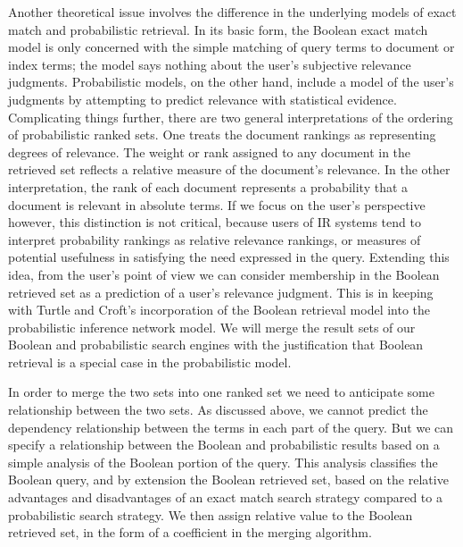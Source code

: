 Another theoretical issue involves the difference in the underlying
models of exact match and probabilistic retrieval. In its basic form,
the Boolean exact match model is only concerned with the simple
matching of query terms to document or index terms; the model says
nothing about the user's subjective relevance judgments. Probabilistic
models, on the other hand, include a model of the user's judgments by
attempting to predict relevance with statistical evidence.
Complicating things further, there are two general interpretations of
the ordering of probabilistic ranked
sets\cite{BOOKSTEIN85,FOXKOLL}. One treats the document rankings as
representing degrees of relevance. The weight or rank assigned to any
document in the retrieved set reflects a relative measure of the
document's relevance. In the other interpretation, the rank of each
document represents a probability that a document is relevant in
absolute terms. If we focus on the user's perspective however, this
distinction is not critical, because users of IR systems tend to
interpret probability rankings as relative relevance rankings, or
measures of potential usefulness in satisfying the need expressed in
the query\cite{BOOKSTEIN83}. Extending this idea, from the user's
point of view we can consider membership in the Boolean retrieved set
as a prediction of a user's relevance judgment. This is in keeping
with Turtle and Croft's incorporation of the Boolean retrieval model
into the probabilistic inference network
model\cite{TURTLE90,TURTLE92}.  We will merge the result sets of our
Boolean and probabilistic search engines with the justification that
Boolean retrieval is a special case in the probabilistic model.

In order to merge the two sets into one ranked set we need to 
anticipate some relationship between the two sets. As discussed above, we 
cannot predict the dependency relationship between the terms in each
part of the query. But we can specify a relationship between the Boolean
and probabilistic results based on a simple analysis of 
the Boolean portion of the query. This analysis classifies the Boolean
query, and by extension the Boolean retrieved set, based on the
relative advantages and disadvantages of an exact match search strategy 
compared to a probabilistic search strategy. We then assign relative value 
to the Boolean retrieved set, in the form of a coefficient in the merging 
algorithm. 

